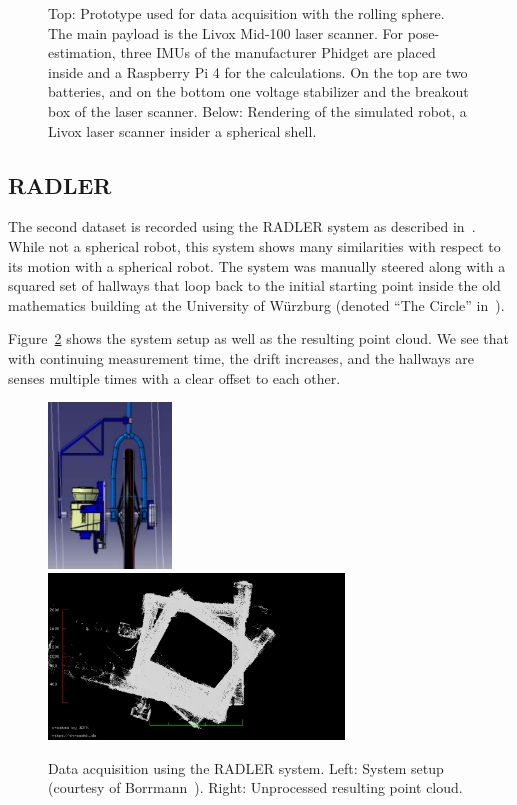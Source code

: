 \documentclass[5p]{elsarticle}
\begin{document}
\begin{figure}
  \caption{Top: Prototype used for data acquisition with the rolling sphere. The main payload is the Livox Mid-100 laser scanner. For pose-estimation, three IMUs of the manufacturer Phidget are placed inside and a Raspberry Pi 4 for the calculations. On the top are two batteries, and on the bottom one voltage stabilizer and the breakout box of the laser scanner. Below: Rendering of the simulated robot, a Livox laser scanner insider a spherical shell. }
  \label{fig:prototype}
\end{figure}


\iffalse %
	\subsection{RADLER}

	The second dataset is recorded using the RADLER system as described in~\cite{Borrmann2020-RADLER}.
	While not a spherical robot, this system shows many similarities with respect to its motion with a spherical robot.
	The system was manually steered along with a squared set of hallways that loop back to the initial starting point inside the old mathematics building at the University of Würzburg (denoted ``The Circle'' in~\cite{Borrmann2020-RADLER}).

	Figure~\ref{fig:radler-mathe} shows the system setup as well as the resulting point cloud.
	We see that with continuing measurement time, the drift increases, and the hallways are senses multiple times with a clear offset to each other. 

	\begin{figure}
		\centering
		\begin{minipage}[c]{\textwidth}
			\includegraphics[width=0.2925\textwidth]{./images/radler_setup}\hfill
			\includegraphics[width=0.7\textwidth]{./images/mathe_top_view}
		\end{minipage}
		\caption{Data acquisition using the RADLER system. Left: System setup (courtesy of Borrmann~\cite{Borrmann2020-RADLER}). Right: Unprocessed resulting point cloud.}
		\label{fig:radler-mathe}
	\end{figure}
\end{document}

